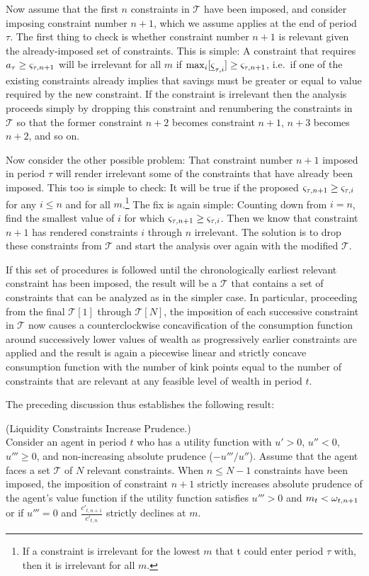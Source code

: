 Now assume that the first $n$ constraints in $\mathcal{T}$ have been imposed, and consider imposing constraint number $n+1$, which we assume applies at the end of period $\tau$.  The first thing to check is whether constraint number $n+1$ is relevant given the already-imposed set of constraints.  This is simple: A constraint that requires ${a}_{\tau} \geq \varsigma_{\tau,n+1}$ will be irrelevant for all ${m}$ if $\max_{i} [\underline{\varsigma}_{\tau,i}] \geq \varsigma_{\tau,n+1}$, i.e.\ if one of the existing constraints already implies that savings must be greater or equal to value required by the new constraint.  If the constraint is irrelevant then the analysis proceeds simply by dropping this constraint and renumbering the constraints in $\mathcal{T}$ so that the former constraint $n+2$ becomes constraint $n+1$, $n+3$ becomes $n+2$, and so on.

Now consider the other possible problem: That constraint number $n+1$ imposed in period $\tau$ will render irrelevant some of the constraints that have already been imposed.  This too is simple to check: It will be true if the proposed $\varsigma_{\tau,n+1} \geq \varsigma_{\tau,i}$ for any $i \leq n$ and for all ${m}$.\footnote{If a constraint is irrelevant for the lowest ${m}$ that t could enter period $\tau$ with, then it is irrelevant for all ${m}$.} The fix is again simple: Counting down from $i=n$, find the smallest value of $i$ for which $\varsigma_{\tau,n+1} \geq \varsigma_{\tau,i}$.  Then we know that constraint $n+1$ has rendered constraints $i$ through $n$ irrelevant. The solution is to drop these constraints from $\mathcal{T}$ and start the analysis over again with the modified $\mathcal{T}$.

If this set of procedures is followed until the chronologically earliest relevant constraint has been imposed, the result will be a $\mathcal{T}$ that contains a set of constraints that can be analyzed as in the simpler case. In particular, proceeding from the final $\mathcal{T}[1]$ through $\mathcal{T}[N]$, the imposition of each successive constraint in $\mathcal{T}$ now causes a counterclockwise concavification of the consumption function around successively lower values of wealth as progressively earlier constraints are applied and the result is again a piecewise linear and strictly concave consumption function with the number of kink points equal to the number of constraints that are relevant at any feasible level of wealth in period $t$.

The preceding discussion thus establishes the following result:
\begin{theorem}\label{thm:lcip2} (Liquidity Constraints Increase Prudence.) \\
	Consider an agent in period $t$ who has a utility function with $u' > 0$, $u'' < 0$, $u''' \geq 0$, and non-increasing absolute prudence ($-u'''/u''$). Assume that the agent faces a set $\mathcal{T}$ of $N$ relevant constraints. When $n \leq N-1$ constraints have been imposed, the imposition of constraint $n+1$ strictly increases absolute prudence of the agent's value function if the utility function satisfies $u''' > 0$ and ${m}_{t} < \omega_{t,n+1}$ or if $u''' = 0$ and $\frac{c'_{t,n+1}}{c'_{t,n}}$ strictly declines at ${m}$.
\end{theorem}

